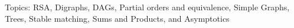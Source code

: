 \documentclass[quiz]{mcs}
\begin{document}

\begin{staffnotes}
Topics: RSA, Digraphs, DAGs, Partial orders and equivalence, Simple Graphs, 
Trees, Stable matching, Sums and Products, and Asymptotics 
\end{staffnotes}















\end{document}
